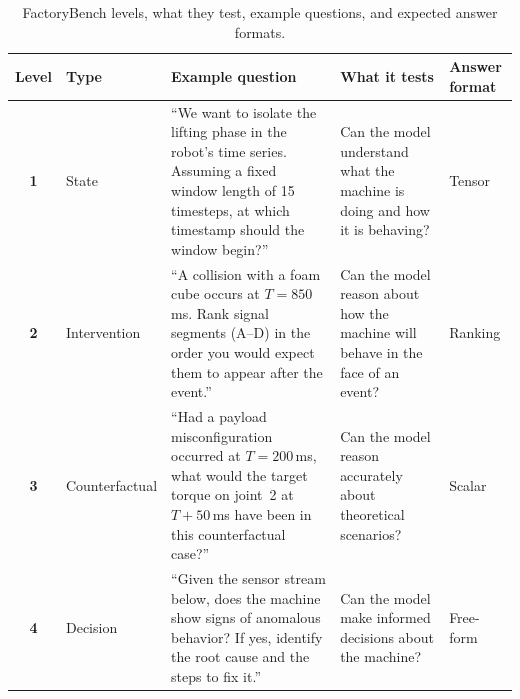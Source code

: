 \begin{table}[htbp]
    \centering
    \caption{FactoryBench levels, what they test, example questions, and expected answer formats.}
    \label{tab:levels_examples}
    \footnotesize
    \setlength{\tabcolsep}{4pt}
    \renewcommand{\arraystretch}{1.15}
    \begin{tabular}{@{}c l >{\raggedright\arraybackslash}p{4.6cm} >{\raggedright\arraybackslash}p{3.0cm} >{\raggedright\arraybackslash}p{1.7cm}@{}}
        \toprule
        Level      & Type           & Example question                                                                                                                                                 & What it tests                                                                   & Answer format \\
        \midrule
        \textbf{1} & State          & ``We want to isolate the lifting phase in the robot's time series. Assuming a fixed window length of 15 timesteps, at which timestamp should the window begin?'' & Can the model understand what the machine is doing and how it is behaving?      & Tensor        \\
        \textbf{2} & Intervention   & ``A collision with a foam cube occurs at $T{=}850$\,ms. Rank signal segments (A--D) in the order you would expect them to appear after the event.''              & Can the model reason about how the machine will behave in the face of an event? & Ranking       \\
        \textbf{3} & Counterfactual & ``Had a payload misconfiguration occurred at $T{=}200$\,ms, what would the target torque on joint~2 at $T{+}50$\,ms have been in this counterfactual case?''     & Can the model reason accurately about theoretical scenarios?                    & Scalar        \\
        \textbf{4} & Decision       & ``Given the sensor stream below, does the machine show signs of anomalous behavior? If yes, identify the root cause and the steps to fix it.''                   & Can the model make informed decisions about the machine?                        & Free-form     \\
        \bottomrule
    \end{tabular}
\end{table}

